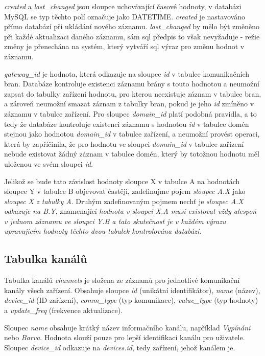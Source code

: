 \emph{created} a \emph{last\_changed} jsou sloupce uchovávající časové hodnoty, v databázi MySQL se typ těchto polí označuje jako DATETIME. \emph{created} je nastavováno přímo databází při ukládání nového záznamu. \emph{last\_changed} by mělo být změněno při každé aktualizaci daného záznamu, sám \acrshort{sql} předpis to však nevyžaduje - režie změny je přenechána na systém, který vytváří \acrshort{sql} výraz pro změnu hodnot v záznamu.

\emph{gateway\_id} je hodnota, která odkazuje na sloupec \emph{id} v tabulce komunikačních bran. Databáze kontroluje existenci záznamu brány s touto hodnotou a neumožní zapsat do tabulky zařízení hodnotu, pro kterou neexistuje záznam v tabulce bran, a zároveň neumožní smazat záznam z tabulky bran, pokud je jeho \emph{id} zmíněno v záznamu v tabulce zařízení. Pro sloupec \emph{domain\_id} platí podobná pravidla, a to tedy že databáze kontroluje existenci záznamu s hodnotou \emph{id} v tabulce domén stejnou jako hodnotou \emph{domain\_id} v tabulce zařízení, a neumožní provést operaci, která by zapříčinila, že pro hodnotu ve sloupci \emph{domain\_id} v tabulce zařízení nebude existovat žádný záznam v tabulce domén, který by totožnou hodnotu měl uloženou ve svém sloupci \emph{id}.

Jelikož se bude tato závislost hodnoty sloupce X v tabulce A na hodnotách sloupce Y v tabulce B objevovat častěji, zadefinujme pojem \emph{sloupec A.X} jako \emph{sloupec X z tabulky A}. Druhým zadefinovaným pojmem nechť je \emph{sloupec A.X odkazuje na B.Y}, znamenající \emph{hodnota v sloupci X.A musí existovat vždy alespoň v jednom záznamu ve sloupci Y.B a tato skutečnost je v každém výrazu upravujícím hodnoty těchto dvou tabulek kontrolována databází}. 

\subsection{Tabulka kanálů}
Tabulka kanálů \emph{channels} je složena ze záznamů pro jednotlivé komunikační kanály všech zařízení. Obsahuje sloupce \emph{id} (unikátní identifikátor), \emph{name} (název), \emph{device\_id} (ID zařízení), \emph{comm\_type} (typ komunikace), \emph{value\_type} (typ hodnoty) a \emph{update\_freq} (frekvence aktualizace).

Sloupec \emph{name} obsahuje krátký název informačního kanálu, například \emph{Vypínání} nebo \emph{Barva}. Hodnota slouží pouze pro lepší identifikaci kanálu pro uživatele. Sloupec \emph{device\_id} odkazuje na \emph{devices.id}, tedy zařízení, jehož kanálem je.

